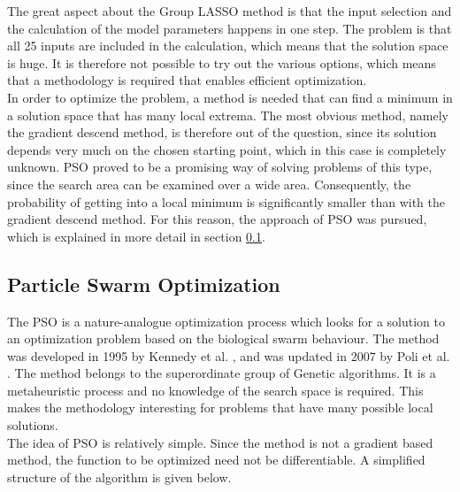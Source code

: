 The great aspect about the Group LASSO method is that the input selection and the calculation of the model parameters happens in one step. The problem is that all 25 inputs are included in the calculation, which means that the solution space is huge. It is therefore not possible to try out the various options, which means that a methodology is required that enables efficient optimization.\\

In order to optimize the problem, a method is needed that can find a minimum in a solution space that has many local extrema. The most obvious method, namely the gradient descend method, is therefore out of the question, since its solution depends very much on the chosen starting point, which in this case is completely unknown. PSO proved to be a promising way of solving problems of this type, since the search area can be examined over a wide area. Consequently, the probability of getting into a local minimum is significantly smaller than with the gradient descend method. For this reason, the approach of PSO was pursued, which is explained in more detail in section \ref{sec:PSO}.


\subsection{Particle Swarm Optimization}
\label{sec:PSO}

The PSO is a nature-analogue optimization process which looks for a solution to an optimization problem based on the biological swarm behaviour. The method was developed in 1995 by Kennedy et al. \cite{Kennedy}, and was updated in 2007 by Poli et al. \cite{Poli_2007}. The method belongs to the superordinate group of Genetic algorithms. It is a metaheuristic process and no knowledge of the search space is required. This makes the methodology interesting for problems that have many possible local solutions. \\

The idea of PSO is relatively simple. Since the method is not a gradient based method, the function to be optimized need not be differentiable. A simplified structure of the algorithm is given below.


